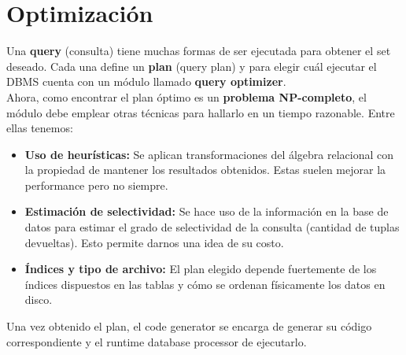 \section*{Optimización}
Una \textbf{query} (consulta) tiene muchas formas de ser ejecutada para obtener el set deseado. Cada una define un \textbf{plan} (query plan) y para elegir cuál ejecutar el DBMS cuenta con un módulo llamado \textbf{query optimizer}. \\
Ahora, como encontrar el plan óptimo es un \textbf{problema NP-completo}, el módulo debe emplear otras técnicas para hallarlo en un tiempo razonable. Entre ellas tenemos:
\begin{itemize}
    \item \textbf{Uso de heurísticas:} Se aplican transformaciones del álgebra relacional con la propiedad de mantener los resultados obtenidos. Estas suelen mejorar la performance pero no siempre.
    \item \textbf{Estimación de selectividad:} Se hace uso de la información en la base de datos para estimar el grado de selectividad de la consulta (cantidad de tuplas devueltas). Esto permite darnos una idea de su costo.
    \item \textbf{Índices y tipo de archivo:} El plan elegido depende fuertemente de los índices dispuestos en las tablas y cómo se ordenan físicamente los datos en disco.
\end{itemize}
Una vez obtenido el plan, el code generator se encarga de generar su código correspondiente y el runtime database processor de ejecutarlo.

